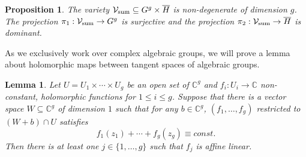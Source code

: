 \documentclass[12pt, reqno]{amsart}
\newcommand{\C}{\mathbb{C}}
\newtheorem{proposition}[theorem]{Proposition}
\newtheorem{lem}[theorem]{Lemma}
\theoremstyle{remark}
\theoremstyle{definition}
\numberwithin{equation}{section}
\begin{document}
\begin{proposition}\label{nondegenerate} The variety $\mathcal{V}_{\rm sum} \subseteq G^g\times\overline{H}$ is non-degenerate of dimension $g$. The projection $\pi_1 : \mathcal{V}_{\rm sum} \to G^g$ is surjective and the projection $\pi_2 : \mathcal{V}_{\rm sum} \to \overline{H}$ is dominant.  
\end{proposition}


 

As we exclusively work over complex algebraic groups, we will prove a lemma about holomorphic maps between tangent spaces of algebraic groups. 
\begin{lem}\label{lemfunctions} 
    Let $ U = U_1\times \cdots \times U_g$ be an open set of $\mathbb{C}^g$ and $f_i: U_i \rightarrow \mathbb{C}$ non-constant, holomorphic functions for $1 \leq i \leq g$. Suppose that there is a vector space $W \subseteq \mathbb{C}^g$ of dimension $1$ such that for any $b \in \C^g$, $(f_1, \dots, f_g)$ restricted to $(W + b) \cap U$ satisfies 
$$f_1(z_1) + \cdots + f_{g}(z_g) \equiv const.$$
Then there is at least one $j \in\{1, \dots, g\}$ such that $f_j$ is affine linear. 
\end{lem}
\end{document}
